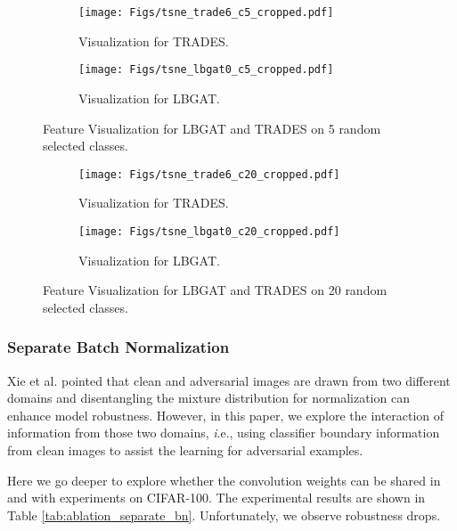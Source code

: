 \documentclass[10pt,twocolumn,letterpaper]{article}
\begin{document}
\begin{figure}
	\begin{subfigure}{.23\textwidth}
		\centering
		\texttt{[image: Figs/tsne\_trade6\_c5\_cropped.pdf]}
		\caption{Visualization for TRADES.}
		\label{fig:sub-first}
	\end{subfigure}
	\begin{subfigure}{.23\textwidth}
		\centering
		\texttt{[image: Figs/tsne\_lbgat0\_c5\_cropped.pdf]}  
		\caption{Visualization for LBGAT.}
		\label{fig:sub-second}
	\end{subfigure}
	\label{fig:tsne_5c}
	\caption{Feature Visualization for LBGAT and TRADES on 5 random selected classes.}
\end{figure}

\begin{figure}
	\begin{subfigure}{.23\textwidth}
		\centering
		\texttt{[image: Figs/tsne\_trade6\_c20\_cropped.pdf]}
		\caption{Visualization for TRADES.}
		\label{fig:tsne_trades6_20c}
	\end{subfigure}
	\begin{subfigure}{.23\textwidth}
		\centering
		\texttt{[image: Figs/tsne\_lbgat0\_c20\_cropped.pdf]}  
		\caption{Visualization for LBGAT.}
		\label{fig:tsne_lbgat0_20c}
	\end{subfigure}
	\label{fig:tsne_20c}
	\caption{Feature Visualization for LBGAT and TRADES on 20 random selected classes.}
\end{figure}

\subsubsection{Separate Batch Normalization}
Xie et al. pointed that clean and adversarial images are drawn from two different domains and disentangling the mixture distribution for normalization can enhance model robustness. However, in this paper, we explore the interaction of information from those two domains, {\textit i.e.}, using classifier boundary information from clean images to assist the learning for adversarial examples.

Here we go deeper to explore whether the convolution weights can be shared in  and  with experiments on CIFAR-100. The experimental results are shown in Table \ref{tab:ablation_separate_bn}. Unfortunately, we observe robustness drops. 
\end{document}
